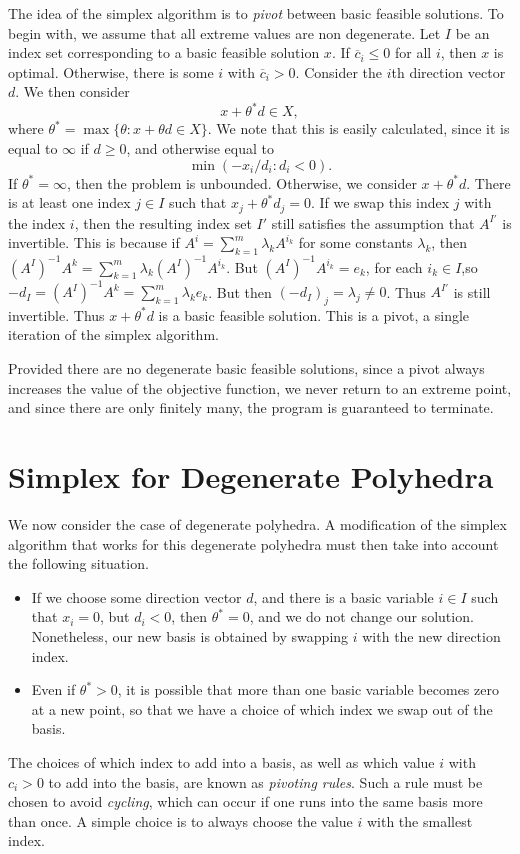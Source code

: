 The idea of the simplex algorithm is to \emph{pivot} between basic feasible solutions. To begin with, we assume that all extreme values are non degenerate. Let $I$ be an index set corresponding to a basic feasible solution $x$. If $\overline{c}_i \leq 0$ for all $i$, then $x$ is optimal. Otherwise, there is some $i$ with $\overline{c}_i > 0$. Consider the $i$th direction vector $d$. We then consider
%
\[ x + \theta^* d \in X, \]
%
where $\theta^* = \max \{ \theta : x + \theta d \in X \}$. We note that this is easily calculated, since it is equal to $\infty$ if $d \geq 0$, and otherwise equal to
%
\[ \min(-x_i/d_i : d_i < 0). \]
%
If $\theta^* = \infty$, then the problem is unbounded. Otherwise, we consider $x + \theta^* d$. There is at least one index $j \in I$ such that $x_j + \theta^* d_j = 0$. If we swap this index $j$ with the index $i$, then the resulting index set $I'$ still satisfies the assumption that $A^{I'}$ is invertible. This is because if $A^i = \sum_{k = 1}^m \lambda_k A^{i_k}$ for some constants $\lambda_k$, then $(A^I)^{-1} A^k = \sum_{k = 1}^m \lambda_k (A^I)^{-1} A^{i_k}$. But $(A^I)^{-1} A^{i_k} = e_k$, for each $i_k \in I$,so $-d_I = (A^I)^{-1} A^k = \sum_{k = 1}^m \lambda_k e_k$. But then $(-d_I)_j = \lambda_j \neq 0$. Thus $A^{I'}$ is still invertible. Thus $x + \theta^* d$ is a basic feasible solution. This is a pivot, a single iteration of the simplex algorithm.

Provided there are no degenerate basic feasible solutions, since a pivot always increases the value of the objective function, we never return to an extreme point, and since there are only finitely many, the program is guaranteed to terminate.

\section{Simplex for Degenerate Polyhedra}

We now consider the case of degenerate polyhedra. A modification of the simplex algorithm that works for this degenerate polyhedra must then take into account the following situation.
%
\begin{itemize}
    \item If we choose some direction vector $d$, and there is a basic variable $i \in I$ such that $x_i = 0$, but $d_i < 0$, then $\theta^* = 0$, and we do not change our solution. Nonetheless, our new basis is obtained by swapping $i$ with the new direction index.

    \item Even if $\theta^* > 0$, it is possible that more than one basic variable becomes zero at a new point, so that we have a choice of which index we swap out of the basis.
\end{itemize}
%
The choices of which index to add into a basis, as well as which value $i$ with $c_i > 0$ to add into the basis, are known as \emph{pivoting rules}. Such a rule must be chosen to avoid \emph{cycling}, which can occur if one runs into the same basis more than once. A simple choice is to always choose the value $i$ with the smallest index.

